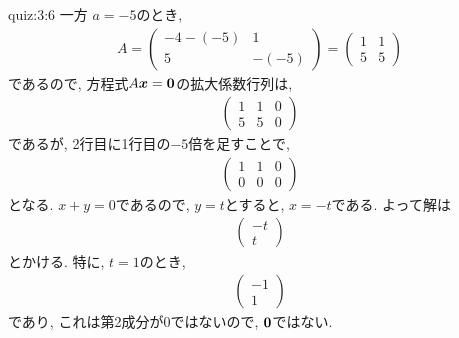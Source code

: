 \begin{answerof}{quiz:3:6}
  一方
  $a=-5$のとき,
  \begin{align*}
    A=\begin{pmatrix}-4-(-5)&1\\5&-(-5)\end{pmatrix}
    =\begin{pmatrix}1&1\\5&5\end{pmatrix}
  \end{align*}
  であるので, 方程式$A\boldsymbol{x}=\boldsymbol{0}$の拡大係数行列は,
  \begin{align*}
    \begin{pmatrix}1&1&0\\5&5&0\end{pmatrix}
  \end{align*}
  であるが, 2行目に1行目の$-5$倍を足すことで,
  \begin{align*}
    \begin{pmatrix}1&1&0\\0&0&0\end{pmatrix}
  \end{align*}
  となる.
  $x+y=0$であるので, $y=t$とすると, $x=-t$である.
  よって解は
  \begin{align*}
    \begin{pmatrix}-t\\t\end{pmatrix}
  \end{align*}
  とかける. 特に, $t=1$のとき,
  \begin{align*}
    \begin{pmatrix}-1\\1\end{pmatrix}
  \end{align*}
  であり, これは第2成分が$0$ではないので, $\boldsymbol{0}$ではない.  
\end{answerof}

